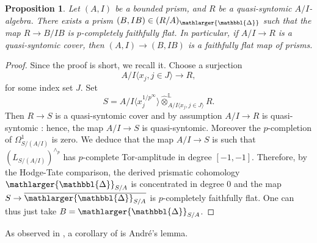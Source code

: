 \documentclass{amsart}
\newcommand{\prism}{{\mathlarger{\mathbbl{\Delta}}}}
\theoremstyle{plain}
\newtheorem{proposition}[theorem]{Proposition}
\theoremstyle{definition}
\begin{document}
\begin{proposition}
 \label{sec:quasi-syntomic-rings-proposition-quasi-syntomic-cover-of-prism-admits-refinement}
Let $(A,I)$ be a bounded prism, and $R$ be a quasi-syntomic $A/I$-algebra. There exists a prism $(B,IB) \in (R/A)_{\prism}$ such that the map $R \to B/IB$ is $p$-completely faithfully flat. In particular, if $A/I \to R$ is a quasi-syntomic cover, then $(A,I) \to (B,IB)$ is a faithfully flat map of prisms. 
\end{proposition}
\begin{proof}
Since the proof is short, we recall it. Choose a surjection
$$A/I\langle x_j, j\in J \rangle \to R, $$for some index set $J$. Set
\[ S = A/I\langle x_j^{1/p^{\infty}} \rangle \hat{\otimes}_{A/I\langle x_j, j\in J \rangle}^{\mathbb{L}} R. \]
Then $R \to S$ is a quasi-syntomic cover and by assumption $A/I \to R$ is quasi-syntomic : hence, the map $A/I \to S$ is quasi-syntomic. Moreover the $p$-completion of $\Omega_{S/(A/I)}^1$ is zero. We deduce that the map $A/I \to S$ is such that $(L_{S/(A/I)})^{\wedge_p}$ has $p$-complete Tor-amplitude in degree $[-1,-1]$. Therefore, by the Hodge-Tate comparison, the derived prismatic cohomology $\prism_{S/A}$ is concentrated in degree $0$ and the map $S \to \overline{\prism_{S/A}}$ is $p$-completely faithfully flat. One can thus just take $B=\prism_{S/A}$. 
\end{proof}

As observed in \cite{bhatt_scholze_prisms_and_prismatic_cohomology}, a corollary of  is Andr\'e's lemma.
\end{document}
